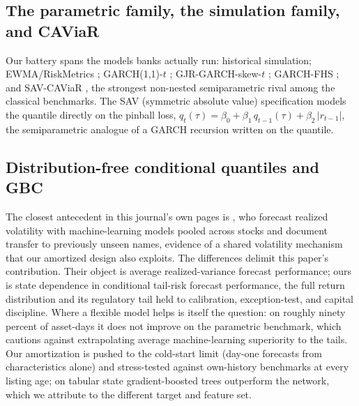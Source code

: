 \documentclass[11pt]{article}
\theoremstyle{remark}
\begin{document}
\subsection{The parametric family, the simulation family, and CAViaR}

Our battery spans the models banks actually run: historical simulation;
EWMA/RiskMetrics \citep{zumbach2007}; GARCH(1,1)-$t$
\citep{bollerslev1986}; GJR-GARCH-skew-$t$ \citep[adding leverage and
skewness;][]{glosten1993};
GARCH-FHS \citep[parametric scale, empirical standardized residuals, the volatile-regime best practice;][]{baroneadesi1999fhs}; and SAV-CAViaR
\citep{engle2004caviar}, the strongest non-nested semiparametric
rival among the classical benchmarks.
The SAV (symmetric absolute value) specification models the quantile
directly on the pinball loss,
$q_t(\tau) = \beta_0 + \beta_1\, q_{t-1}(\tau) + \beta_2\,|r_{t-1}|$, the
semiparametric analogue of a GARCH recursion written on the quantile.

\subsection{Distribution-free conditional quantiles and GBC}

The closest antecedent in this journal's own pages is
\citet{zhang2024commonality}, who forecast realized volatility with
machine-learning models pooled across stocks and document transfer to previously unseen names, evidence of a shared volatility mechanism
that our amortized design also exploits. The differences delimit this
paper's contribution. Their object is average realized-variance forecast
performance; ours is state dependence in conditional tail-risk forecast
performance, the full return distribution and its regulatory tail held to
calibration, exception-test, and capital discipline. Where a flexible
model helps is itself the question: on roughly ninety percent of
asset-days it does not improve on the parametric benchmark, which cautions
against extrapolating average machine-learning superiority to the tails.
Our amortization is pushed to the cold-start limit (day-one forecasts from
characteristics alone) and stress-tested against own-history benchmarks at
every listing age; on tabular state gradient-boosted trees outperform the
network, which we attribute to the different target and feature set.
\end{document}
